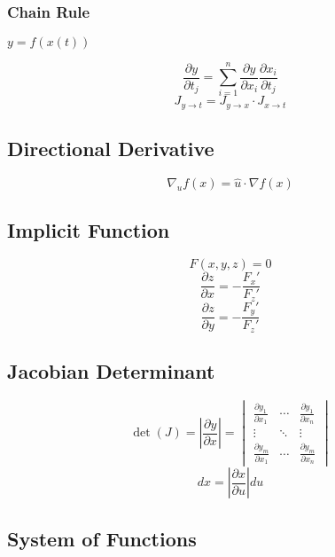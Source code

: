 \documentclass{article}
\begin{document}
\subsubsection{Chain Rule}

$y = f(x(t))$

\[
    \frac{\partial y}{\partial t_j} = \sum_{i=1}^n \frac{\partial y}{\partial x_i} \frac{\partial x_i}{\partial t_j}
\]
\[
    J_{y \to t} = J_{y \to x} \cdot J_{x \to t}
\]

\subsection{Directional Derivative}

\[
    \nabla_u f(x) = \hat{u} \cdot \nabla f(x)
\]

\subsection{Implicit Function}

\[
    F(x, y, z) = 0
\]
\[
    \frac{\partial z}{\partial x} = -\frac{F_x'}{F_z'}
\]
\[
    \frac{\partial z}{\partial y} = -\frac{F_y'}{F_z'}
\]

\subsection{Jacobian Determinant}

\[
    \det(J) = \left|\frac{\partial y}{\partial x}\right| = \begin{vmatrix}
        \frac{\partial y_1}{\partial x_1} & \cdots & \frac{\partial y_1}{\partial x_n} \\
        \vdots & \ddots & \vdots \\
        \frac{\partial y_m}{\partial x_1} & \cdots & \frac{\partial y_m}{\partial x_n}
    \end{vmatrix}
\]
\[
    dx = \left|\frac{\partial x}{\partial u}\right| du
\]

\subsection{System of Functions}
\end{document}
